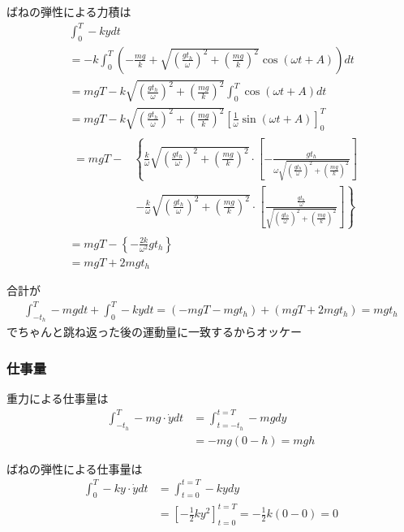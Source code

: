 \documentclass[a4paper,11pt]{jsarticle}
\begin{document}
ばねの弾性による力積は
\begin{align}
   & \int_0^T -ky dt
  \\ & = -k \int_0^T
  \left( -\frac{mg}{k} + \sqrt{\left(\frac{gt_h}{\omega}\right)^2 + \left(\frac{mg}{k}\right)^2} \cos \left( \omega t + A \right) \right) dt
  \\ & = mgT - k \sqrt{\left(\frac{gt_h}{\omega}\right)^2 + \left(\frac{mg}{k}\right)^2} \int_0^T \cos \left( \omega t + A \right) dt
  \\ & = mgT - k \sqrt{\left(\frac{gt_h}{\omega}\right)^2 + \left(\frac{mg}{k}\right)^2} \left[ \frac{1}{\omega} \sin (\omega t + A) \right]_0^T
  \\ & \begin{aligned}
    = mgT -
     & \left\{ \frac{k}{\omega} \sqrt{\left(\frac{gt_h}{\omega}\right)^2 + \left(\frac{mg}{k}\right)^2}
    \cdot \left[- \frac{gt_h}{ \omega \sqrt{\left(\frac{gt_h}{\omega}\right)^2 + \left(\frac{mg}{k}\right)^2} } \right] \right.
    \\
     & \ \left. - \frac{k}{\omega} \sqrt{\left(\frac{gt_h}{\omega}\right)^2 + \left(\frac{mg}{k}\right)^2}
    \cdot \left[ \frac{\frac{gt_h}{\omega}}{\sqrt{\left(\frac{gt_h}{\omega}\right)^2 + \left(\frac{mg}{k}\right)^2}} \right] \right\}
  \end{aligned}
  \\& = mgT - \left\{ - \frac{2k}{\omega^2} gt_h \right\}
  \\& = mgT + 2mgt_h
\end{align}

合計が
\begin{align}
  \int_{-t_h}^{T} -mg dt + \int_0^T -ky dt
  = \left( -mgT - mgt_h \right) + \left( mgT + 2mgt_h \right) = mgt_h
\end{align}
でちゃんと跳ね返った後の運動量に一致するからオッケー

\subsubsection{仕事量}
重力による仕事量は
\begin{align}
  \int_{-t_h}^{T} -mg \cdot \dot{y} dt
   & = \int_{t=-t_h}^{t=T} -mgdy
  \\
   & = -mg(0 - h) = mgh
\end{align}

ばねの弾性による仕事量は
\begin{align}
  \int_{0}^{T} -ky \cdot \dot{y} dt
   & = \int_{t=0}^{t=T} -kydy
  \\
   & = \left[ -\frac{1}{2} ky^2 \right]_{t=0}^{t=T}
  = -\frac{1}{2}k (0 - 0) = 0
\end{align}
\end{document}
